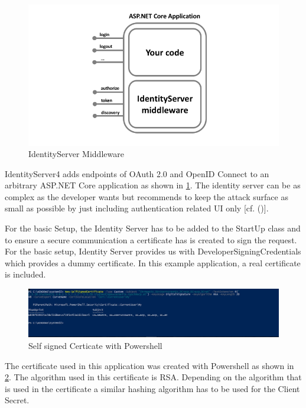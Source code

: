 \begin{figure}[h]
	\centering
	\includegraphics[width=0.8\linewidth]{images/middlewareIdentityServer}
	\caption{IdentityServer Middleware}
	\label{fig:middlewareidentityserver}
\end{figure}
 

IdentityServer4 adds endpoints of OAuth 2.0 and OpenID Connect to an arbitrary ASP.NET Core application as shown in \ref{fig:middlewareidentityserver}. The identity server can be as complex as the developer wants but \cite{Brock:2018:ID4} recommends to keep the attack surface as small as possible by just including authentication related UI only [cf. (\cite{Brock:2018:ID4})]. 


For the basic Setup, the Identity Server has to be added to the StartUp class and to ensure a secure communication a certificate has is created to sign the request. For the basic setup, Identity Server provides us with DeveloperSigningCredentials which provides a dummy certificate. In this example application, a real certificate is included. 

\begin{figure}[h]
	\centering
	\includegraphics[width=0.8\linewidth]{images/self-signed-certicate}
	\caption{Self signed Certicate with Powershell}
	\label{fig:self-signed-certicate}
\end{figure}

The certificate used in this application was created with Powershell as shown in \ref{fig:self-signed-certicate}. The algorithm used in this certificate is RSA. Depending on the algorithm that is used in the certificate a similar hashing algorithm has to be used for the Client Secret.


